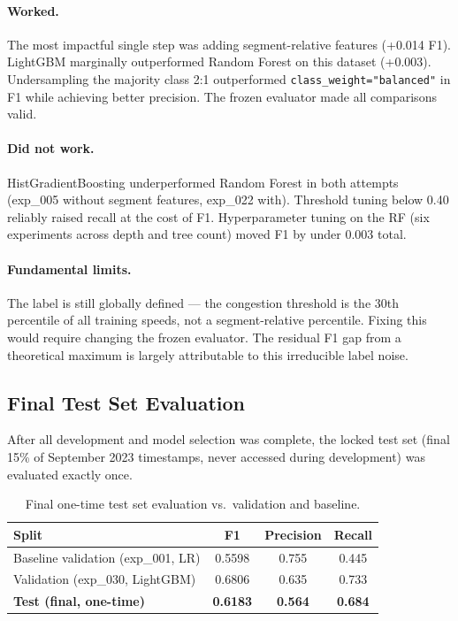 \documentclass{article}
\begin{document}
\paragraph{Worked.} The most impactful single step was adding segment-relative features
(+0.014 F1). LightGBM marginally outperformed Random Forest on this dataset (+0.003).
Undersampling the majority class 2:1 outperformed \texttt{class\_weight="balanced"}
in F1 while achieving better precision. The frozen evaluator made all comparisons valid.

\paragraph{Did not work.} HistGradientBoosting underperformed Random Forest in both
attempts (exp\_005 without segment features, exp\_022 with). Threshold tuning below
0.40 reliably raised recall at the cost of F1. Hyperparameter tuning on the RF
(six experiments across depth and tree count) moved F1 by under 0.003 total.

\paragraph{Fundamental limits.} The label is still globally defined — the congestion
threshold is the 30th percentile of all training speeds, not a segment-relative
percentile. Fixing this would require changing the frozen evaluator. The residual
F1 gap from a theoretical maximum is largely attributable to this irreducible label noise.

\subsection{Final Test Set Evaluation}

After all development and model selection was complete, the locked test set (final 15\%
of September 2023 timestamps, never accessed during development) was evaluated exactly once.

\begin{table}[h]
\caption{Final one-time test set evaluation vs.\ validation and baseline.}
\label{tab:test}
\centering
\begin{tabular}{lccc}
\toprule
Split & F1 & Precision & Recall \\
\midrule
Baseline validation (exp\_001, LR) & 0.5598 & 0.755 & 0.445 \\
Validation (exp\_030, LightGBM) & 0.6806 & 0.635 & 0.733 \\
\textbf{Test (final, one-time)} & \textbf{0.6183} & \textbf{0.564} & \textbf{0.684} \\
\bottomrule
\end{tabular}
\end{table}
\end{document}

